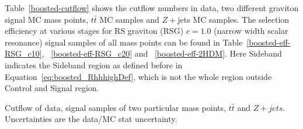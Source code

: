 Table~\ref{boosted-cutflow} shows the cutflow numbers in data, two different graviton signal MC mass points, $t\bar{t}$ MC samples and $Z+$jets MC samples. The selection efficiency at various stages for RS graviton (RSG) $c=1.0$ (narrow width scalar resonance) signal samples of all mass points can be found in Table~\ref{boosted-eff-RSG_c10}, ~\ref{boosted-eff-RSG_c20} and ~\ref{boosted-eff-2HDM}. Here Sideband indicates the Sideband region as defined before in Equation~\ref{eq:boosted_RhhhighDef}, which is not the whole region outside Control and Signal region.

\begin{table}[htbp!]
\scriptsize
\begin{center}
\resizebox{\textwidth}{!}{

}
\end{center}
\caption{Cutflow of data, signal samples of two particular mass points, $t\bar{t}$ and $Z+jets$. Uncertainties are the data/MC stat uncertainty.}
\label{boosted-cutflow}
\end{table}


